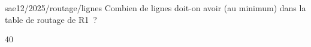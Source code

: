 \begin{question}{sae12/2025/routage/lignes}
  Combien de lignes doit-on avoir (au minimum) dans la table de
  routage de R1~?
  \begin{reponses}{4}{0}
  \end{reponses}
\end{question}
